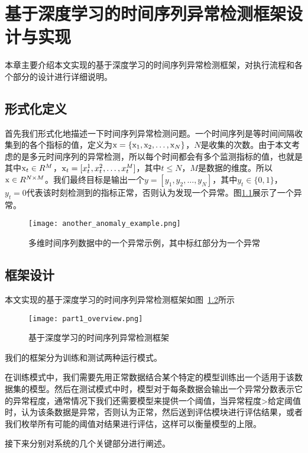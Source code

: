 
\chapter{基于深度学习的时间序列异常检测框架设计与实现}
\label{cha:intro}
本章主要介绍本文实现的基于深度学习的时间序列异常检测框架，对执行流程和各个部分的设计进行详细说明。
\section{形式化定义}
首先我们形式化地描述一下时间序列异常检测问题。一个时间序列是等时间间隔收集到的各个指标的值，定义为${\rm x}=\{{\rm x}_1,{\rm x}_2,\dots,{\rm x}_N\}$，$N$是收集的次数。由于本文考虑的是多元时间序列的异常检测，所以每个时间都会有多个监测指标的值，也就是其中${\rm x}_t\in R^M$，${\rm x}_t=[x_t^1,x_t^2,\dots,x_t^M]$，其中$t\leq N$，$M$是数据的维度。所以${\rm x}\in R^{N\times M}$。我们最终目标是输出一个$y=[y_1, y_2,\dots, y_N ]$，其中$y_t\in \{0,1\}$，$y_t=0$代表该时刻检测到的指标正常，否则认为发现一个异常。图\ref{fig:anomaly_example}展示了一个异常。
\begin{figure}[htbp]
  \centering
  \texttt{[image: another\_anomaly\_example.png]}
  \caption{多维时间序列数据中的一个异常示例，其中标红部分为一个异常}
  \label{fig:anomaly_example}
\end{figure}

\section{框架设计}
本文实现的基于深度学习的时间序列异常检测框架如图~\ref{fig:part1_overview}所示

\begin{figure}[htbp]
    \centering
    \texttt{[image: part1\_overview.png]}
    \caption{基于深度学习的时间序列异常检测框架}
    \label{fig:part1_overview}
  \end{figure}

我们的框架分为训练和测试两种运行模式。

在训练模式中，我们需要先用正常数据结合某个特定的模型训练出一个适用于该数据集的模型。然后在测试模式中时，模型对于每条数据会输出一个异常分数表示它的异常程度，通常情况下我们还需要模型来提供一个阈值，当异常程度>给定阈值时，认为该条数据是异常，否则认为正常，然后送到评估模块进行评估结果，或者我们枚举所有可能的阈值对结果进行评估，这样可以衡量模型的上限。

接下来分别对系统的几个关键部分进行阐述。

